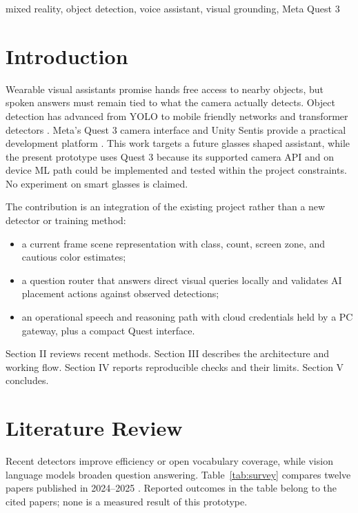 \documentclass[conference]{IEEEtran}
\begin{document}
\begin{IEEEkeywords}
mixed reality, object detection, voice assistant, visual grounding, Meta Quest 3
\end{IEEEkeywords}

\section{Introduction}
Wearable visual assistants promise hands free access to nearby objects, but spoken answers must remain tied to what the camera actually detects. Object detection has advanced from YOLO to mobile friendly networks and transformer detectors \cite{yolo,coco,mobilenet,rtdetr}. Meta's Quest 3 camera interface and Unity Sentis provide a practical development platform \cite{meta,unity}. This work targets a future glasses shaped assistant, while the present prototype uses Quest 3 because its supported camera API and on device ML path could be implemented and tested within the project constraints. No experiment on smart glasses is claimed.

The contribution is an integration of the existing project rather than a new detector or training method:
\begin{itemize}
\item a current frame scene representation with class, count, screen zone, and cautious color estimates;
\item a question router that answers direct visual queries locally and validates AI placement actions against observed detections;
\item an operational speech and reasoning path with cloud credentials held by a PC gateway, plus a compact Quest interface.
\end{itemize}
Section II reviews recent methods. Section III describes the architecture and working flow. Section IV reports reproducible checks and their limits. Section V concludes.

\section{Literature Review}
Recent detectors improve efficiency or open vocabulary coverage, while vision language models broaden question answering. Table~\ref{tab:survey} compares twelve papers published in 2024--2025 \cite{yolov9,yolov10,yolov12,yoloworld,groundingdino15,florence2,mobileclip,mobilevlmv2,paligemma,llavaonevision,qwen2vl,molmo}. Reported outcomes in the table belong to the cited papers; none is a measured result of this prototype.
\end{document}
